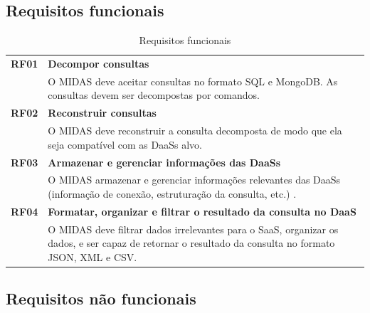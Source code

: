 \documentclass[11pt,a4paper]{article}
\begin{document}
\subsection{Requisitos funcionais}

\begin{table}[htb]
\centering
\caption{Requisitos funcionais} \label{tab:rf}
\begin{tabular*}{\linewidth}{@{\extracolsep{\fill}}|r p{13cm}|}    \hline
\textbf{RF01} 	& \textbf{Decompor consultas}\\ \cline{2-2}
 				& O MIDAS deve aceitar consultas no formato SQL e MongoDB. As consultas devem ser decompostas por comandos.  \\\hline
\textbf{RF02} 	& \textbf{Reconstruir consultas}\\ \cline{2-2}
 				& O MIDAS deve reconstruir a consulta decomposta de modo que ela seja compatível com as DaaSs alvo.   \\ \hline
\textbf{RF03} 	& \textbf{Armazenar e gerenciar informações das DaaSs}\\ \cline{2-2}
 				& O MIDAS armazenar e gerenciar informações relevantes das DaaSs (informação de conexão, estruturação da consulta, etc.) .  \\ \hline
 \textbf{RF04} 	& \textbf{Formatar, organizar e filtrar o resultado da consulta no DaaS}\\ \cline{2-2}
 				& O MIDAS deve filtrar dados irrelevantes para o SaaS, organizar os dados,  e ser capaz de retornar o resultado da consulta no formato JSON, XML e CSV.  \\ \hline
\end{tabular*}
\end{table}






\subsection{Requisitos não funcionais}
\end{document}
